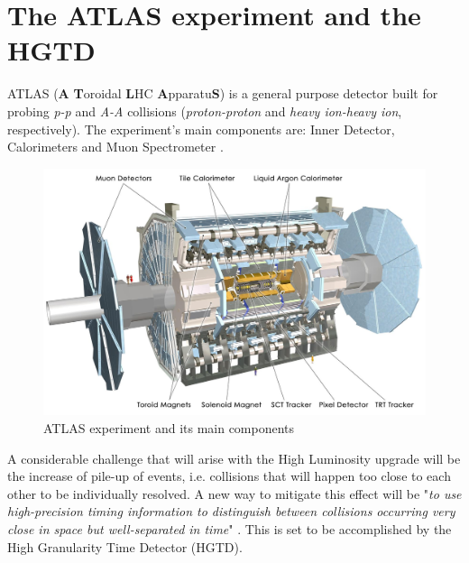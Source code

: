 

\section{The ATLAS experiment and the HGTD}

ATLAS (\textbf{A} \textbf{T}oroidal \textbf{L}HC \textbf{A}pparatu\textbf{S}) is a general purpose detector built for probing \textit{p-p} and \textit{A-A} collisions (\textit{proton-proton} and \textit{heavy ion-heavy ion}, respectively). 
The experiment's main components are: Inner Detector, Calorimeters and Muon Spectrometer \cite{Collaboration_The_ATLAS2008}.

\begin{figure}[!h]
    \centering
    \includegraphics[width=\textwidth]{Images/intro/ATLAS_with_description.jpg}
    \caption{ATLAS experiment and its main components}
    \label{fig:ATLAS}
\end{figure}

A considerable challenge that will arise with the High Luminosity upgrade will be the increase of pile-up of events, i.e. collisions that will happen too close to each other to be individually resolved. 
A new way to mitigate this effect will be "\textit{to use high-precision timing information to distinguish between collisions occurring very close in space but well-separated in time}" \cite{CERN-LHCC-2020-007}. This is set to be accomplished by the High Granularity Time Detector (HGTD).

